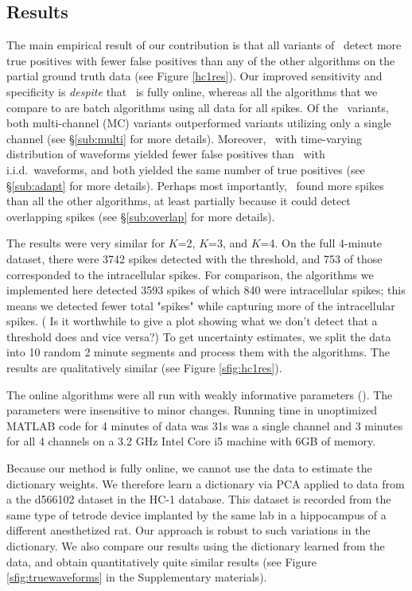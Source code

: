 \subsection{Results}

  The main empirical result of our contribution is that all variants of \smug~detect more true positives with fewer false positives
than any of the other algorithms on the partial ground truth data (see Figure \ref{hc1res}).  
Our improved sensitivity and specificity is \emph{despite} that \smug~is fully online, whereas all the algorithms that we compare to are batch algorithms using all data for all spikes.  Of the \smug~variants, both multi-channel (MC) variants outperformed variants utilizing only a single channel (see \S \ref{sub:multi} for more details).  Moreover, \smug~with time-varying distribution of waveforms yielded fewer false positives than \smug~with i.i.d.~waveforms, and both yielded the same number of true positives (see \S \ref{sub:adapt} for more details).  Perhaps most importantly, \smug~found more spikes than all the other algorithms, at least partially because it could detect overlapping spikes (see \S \ref{sub:overlap} for more details).


The results were very similar for $K$=2, $K$=3, and $K$=4.   On the full 4-minute dataset, there were 3742 spikes detected with the threshold, and 753 of those corresponded to the intracellular spikes.  
For comparison, the algorithms we implemented here detected 3593 spikes of which 840 were intracellular spikes; this means we detected fewer total "spikes" while capturing more of the intracellular spikes. ({\color{red}  Is it worthwhile to give a plot showing what we don't detect that a threshold does and vice versa?})
To get uncertainty estimates, we split the data into 10 random 2 minute segments and process them with the algorithms. The results are qualitatively similar (see Figure \ref{sfig:hc1res}).


The online algorithms were all run with weakly informative parameters (). The parameters were insensitive to minor changes.  Running time in unoptimized MATLAB code for 4 minutes of data was 31s was a single channel and 3 minutes for all 4 channels on a 3.2 GHz Intel Core i5 machine with 6GB of memory.

Because our method is fully online, we cannot use the data to estimate the dictionary weights. We therefore learn a dictionary via PCA applied to data from a the d566102 dataset in the HC-1 database.  This dataset is recorded from the same type of tetrode device implanted by the same lab in a hippocampus of a different anesthetized rat. Our approach is robust to such variations in the dictionary.  We also compare our results using the dictionary learned from the data, and obtain quantitatively quite similar results (see Figure \ref{sfig:truewaveforms} in the Supplementary materials).

